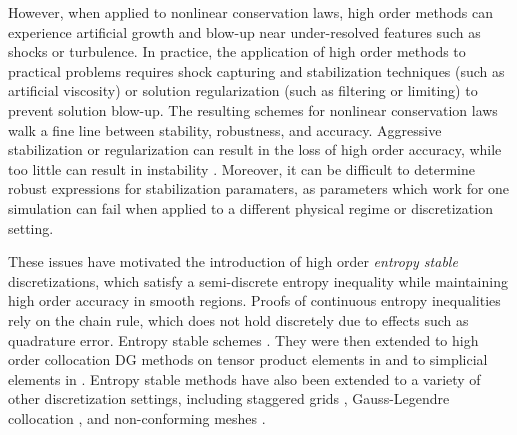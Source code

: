 \documentclass{svjour3}                     %
\newcommand{\rnote}[1]{{\color{red}{#1}}}
\begin{document}
However, when applied to nonlinear conservation laws, high order methods can experience artificial growth and blow-up near under-resolved features such as shocks or turbulence.  In practice, the application of high order methods to practical problems requires shock capturing and stabilization techniques (such as artificial viscosity) or solution regularization (such as filtering or limiting) to prevent solution blow-up.  The resulting schemes for nonlinear conservation laws walk a fine line between stability, robustness, and accuracy.  Aggressive stabilization or regularization can result in the loss of high order accuracy, while too little can result in instability \cite{wang2013high}.  Moreover, it can be difficult to determine robust expressions for stabilization paramaters, as parameters which work for one simulation can fail when applied to a different physical regime or discretization setting.  

These issues have motivated the introduction of high order \textit{entropy stable} discretizations, which satisfy a semi-discrete entropy inequality while maintaining high order accuracy in smooth regions.  Proofs of continuous entropy inequalities rely on the chain rule, which does not hold discretely due to effects such as quadrature error.   Entropy stable schemes \rnote{were originally introduced in the context of finite volume methods} \cite{tadmor1987numerical, tadmor2003entropy, fjordholm2012arbitrarily,chandrashekar2013kinetic, tadmor2016entropy, ray2016entropy}.  They were then extended to high order collocation DG methods on tensor product elements in \cite{fisher2013high, carpenter2014entropy, gassner2016split, gassner2017br1} and to simplicial elements in \cite{crean2017high, chen2017entropy, crean2018entropy, chan2017discretely, chan2018discretely}.  \rnote{These extensions combine summation-by-parts (SBP) differentiation operators, which satisfy a matrix analogue of integration by parts, with ``flux differencing'' for the discretization of nonlinear convective terms.  Together, these techniques circumvents the loss of the chain rule while preserving a semi-discrete analogue of the continuous entropy inequality.}
Entropy stable methods have also been extended to a variety of other discretization settings, including staggered grids \cite{parsani2016entropy, fernandez2019staggered}, Gauss-Legendre collocation \cite{chan2018efficient}, and non-conforming meshes \cite{friedrich2017entropy}.  
\end{document}
